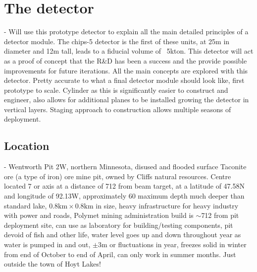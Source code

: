 \section{The \chipsfive detector} %
\label{sec:chips_detector} %

- Will use this prototype detector to explain all the main detailed principles of a \chips
detector module. The chips-5 detector is the first of these units, at 25m in diameter and 12m
tall, leads to a fiducial volume of ~5kton. This detector will act as a proof of concept that the
R\&D has been a success and the provide possible improvements for future iterations. All the main
\chips concepts are explored with this detector. Pretty accurate to what a final \chips detector
module should look like, first prototype to scale. Cylinder as this is significantly easier to
construct and engineer, also allows for additional planes to be installed growing the detector in
vertical layers. Staging approach to construction allows multiple seasons of deployment.

\subsection{Location} %
\label{sec:chips_detector_location} %

- Wentworth Pit 2W, northern Minnesota, disused and flooded surface Taconite ore (a type of iron)
ore mine pit, owned by Cliffs natural resources. Centre located \unit{7}{} or \numi
axis at a distance of \unit{712}{} from beam target, at a latitude of 47.58N and
longitude of 92.13W, approximately \unit{60}{} maximum depth much deeper than standard
lake, $0.8\mathrm{km}\times0.8\mathrm{km}$ in size, heavy infrastructure for heavy industry with
power and roads, Polymet mining administration build is $\sim$\unit{712}{} from pit
deployment site, can use as laboratory for building/testing components, pit devoid of fish and
other life, water level goes up and down throughout year as water is pumped in and out, $\pm
    3\mathrm{m}$ or fluctuations in year, freezes solid in winter from end of October to end of April,
can only work in summer months. Just outside the town of Hoyt Lakes!

